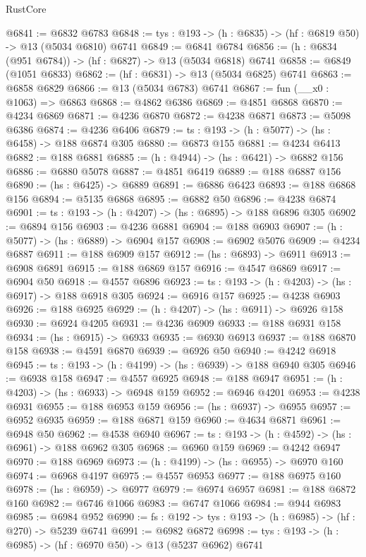 \begin{lexlean}{RustCore}
\begin{coremodule}
@6841 := @6832 @6783
@6848 := {tys : @193} -> (h : @6835) -> (hf : @6819 @50) -> @13 (@5034 @6810) @6741
@6849 := @6841 @6784
@6856 := (h : @6834 (@951 @6784)) -> (hf : @6827) -> @13 (@5034 @6818) @6741
@6858 := @6849 (@1051 @6833)
@6862 := (hf : @6831) -> @13 (@5034 @6825) @6741
@6863 := @6858 @6829
@6866 := @13 (@5034 @6783) @6741
@6867 := fun (__x0 : @1063) => @6863
@6868 := @4862 @6386
@6869 := @4851 @6868
@6870 := @4234 @6869
@6871 := @4236 @6870
@6872 := @4238 @6871
@6873 := @5098 @6386
@6874 := @4236 @6406
@6879 := {ts : @193} -> (h : @5077) -> (hs : @6458) -> @188 @6874 @305
@6880 := @6873 @155
@6881 := @4234 @6413
@6882 := @188 @6881
@6885 := (h : @4944) -> (hs : @6421) -> @6882 @156
@6886 := @6880 @5078
@6887 := @4851 @6419
@6889 := @188 @6887 @156
@6890 := (hs : @6425) -> @6889
@6891 := @6886 @6423
@6893 := @188 @6868 @156
@6894 := @5135 @6868
@6895 := @6882 @50
@6896 := @4238 @6874
@6901 := {ts : @193} -> (h : @4207) -> (hs : @6895) -> @188 @6896 @305
@6902 := @6894 @156
@6903 := @4236 @6881
@6904 := @188 @6903
@6907 := (h : @5077) -> (hs : @6889) -> @6904 @157
@6908 := @6902 @5076
@6909 := @4234 @6887
@6911 := @188 @6909 @157
@6912 := (hs : @6893) -> @6911
@6913 := @6908 @6891
@6915 := @188 @6869 @157
@6916 := @4547 @6869
@6917 := @6904 @50
@6918 := @4557 @6896
@6923 := {ts : @193} -> (h : @4203) -> (hs : @6917) -> @188 @6918 @305
@6924 := @6916 @157
@6925 := @4238 @6903
@6926 := @188 @6925
@6929 := (h : @4207) -> (hs : @6911) -> @6926 @158
@6930 := @6924 @4205
@6931 := @4236 @6909
@6933 := @188 @6931 @158
@6934 := (hs : @6915) -> @6933
@6935 := @6930 @6913
@6937 := @188 @6870 @158
@6938 := @4591 @6870
@6939 := @6926 @50
@6940 := @4242 @6918
@6945 := {ts : @193} -> (h : @4199) -> (hs : @6939) -> @188 @6940 @305
@6946 := @6938 @158
@6947 := @4557 @6925
@6948 := @188 @6947
@6951 := (h : @4203) -> (hs : @6933) -> @6948 @159
@6952 := @6946 @4201
@6953 := @4238 @6931
@6955 := @188 @6953 @159
@6956 := (hs : @6937) -> @6955
@6957 := @6952 @6935
@6959 := @188 @6871 @159
@6960 := @4634 @6871
@6961 := @6948 @50
@6962 := @4538 @6940
@6967 := {ts : @193} -> (h : @4592) -> (hs : @6961) -> @188 @6962 @305
@6968 := @6960 @159
@6969 := @4242 @6947
@6970 := @188 @6969
@6973 := (h : @4199) -> (hs : @6955) -> @6970 @160
@6974 := @6968 @4197
@6975 := @4557 @6953
@6977 := @188 @6975 @160
@6978 := (hs : @6959) -> @6977
@6979 := @6974 @6957
@6981 := @188 @6872 @160
@6982 := @6746 @1066
@6983 := @6747 @1066
@6984 := @944 @6983
@6985 := @6984 @952
@6990 := {fs : @192} -> {tys : @193} -> (h : @6985) -> (hf : @270) -> @5239 @6741
@6991 := @6982 @6872
@6998 := {tys : @193} -> (h : @6985) -> (hf : @6970 @50) -> @13 (@5237 @6962) @6741

\end{coremodule}
\end{lexlean}
